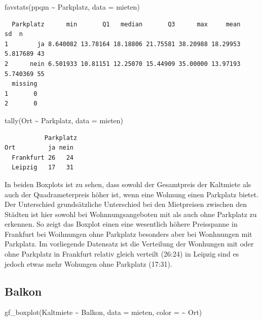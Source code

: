 \documentclass[
  a4paper,
  DIV=11]{scrartcl}
\newenvironment{Shaded}{\begin{snugshade}}{\end{snugshade}}
\newcommand{\AttributeTok}[1]{\textcolor[rgb]{0.40,0.45,0.13}{#1}}
\newcommand{\FunctionTok}[1]{\textcolor[rgb]{0.28,0.35,0.67}{#1}}
\newcommand{\NormalTok}[1]{\textcolor[rgb]{0.00,0.23,0.31}{#1}}
\newcommand{\SpecialCharTok}[1]{\textcolor[rgb]{0.37,0.37,0.37}{#1}}
\begin{document}
\begin{Shaded}
\begin{Highlighting}[]
\FunctionTok{favstats}\NormalTok{(ppqm }\SpecialCharTok{\textasciitilde{}}\NormalTok{ Parkplatz, }\AttributeTok{data =}\NormalTok{ mieten)}
\end{Highlighting}
\end{Shaded}

\begin{verbatim}
  Parkplatz      min       Q1   median       Q3      max     mean       sd  n
1        ja 8.640082 13.78164 18.18806 21.75581 38.20988 18.29953 5.817689 43
2      nein 6.501933 10.81151 12.25070 15.44909 35.00000 13.97193 5.740369 55
  missing
1       0
2       0
\end{verbatim}

\begin{Shaded}
\begin{Highlighting}[]
\FunctionTok{tally}\NormalTok{(Ort }\SpecialCharTok{\textasciitilde{}}\NormalTok{ Parkplatz, }\AttributeTok{data =}\NormalTok{ mieten)}
\end{Highlighting}
\end{Shaded}

\begin{verbatim}
           Parkplatz
Ort         ja nein
  Frankfurt 26   24
  Leipzig   17   31
\end{verbatim}

In beiden Boxplots ist zu sehen, dass sowohl der Gesamtpreis der
Kaltmiete als auch der Quadrameterpreis höher ist, wenn eine Wohnung
einen Parkplatz bietet.\\
Der Unterschied grundsätzliche Unterschied bei den Mietpreisen zwischen
den Städten ist hier sowohl bei Wohnnungsangeboten mit als auch ohne
Parkplatz zu erkennen. So zeigt das Boxplot einen eine wesentlich höhere
Preisspanne in Frankfurt bei Woihnungen ohne Parkplatz besonders aber
bei Wonhnungen mit Parkplatz. Im vorliegende Datensatz ist die
Verteilung der Wonhungen mit oder ohne Parkplatz in Frankfurt relativ
gleich verteilt (26:24) in Leipzig sind es jedoch etwas mehr Wohungen
ohne Parkplatz (17:31).

\hypertarget{balkon}{%
\subsection{Balkon}\label{balkon}}

\begin{Shaded}
\begin{Highlighting}[]
\FunctionTok{gf\_boxplot}\NormalTok{(Kaltmiete }\SpecialCharTok{\textasciitilde{}}\NormalTok{ Balkon, }\AttributeTok{data =}\NormalTok{ mieten, }\AttributeTok{color =} \SpecialCharTok{\textasciitilde{}}\NormalTok{ Ort)}
\end{Highlighting}
\end{Shaded}
\end{document}

